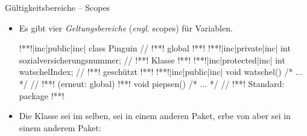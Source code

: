 \begin{frame}[fragile]{Gültigkeitsbereiche -- Scopes}
    \begin{itemize}[<+(1)->]
        \item Es gibt vier \emph{Geltungsbereiche} (\textit{engl.} scopes) für Variablen.
\begin{plainjava}[language=xJava]
!**!|inc|public|inc| class Pinguin { // !**! global
!**!    !**!|inc|private|inc| int sozialversicherungsnummer; // !**! Klasse
!**!    !**!|inc|protected|inc| int watschelIndex; // !**! geschützt
!**!    !**!|inc|public|inc| void watschel() { /* ... */ } // !**! (erneut: global)
!**!    void piepsen() { /* ... */ } // !**! Standard: package
!**!}
\end{plainjava}
    \item<8-> Die Klasse  sei im selben,  sei in einem anderen Paket,  erbe von  aber sei in einem anderem Paket: \medskip\par
    \end{itemize}
\end{frame}

